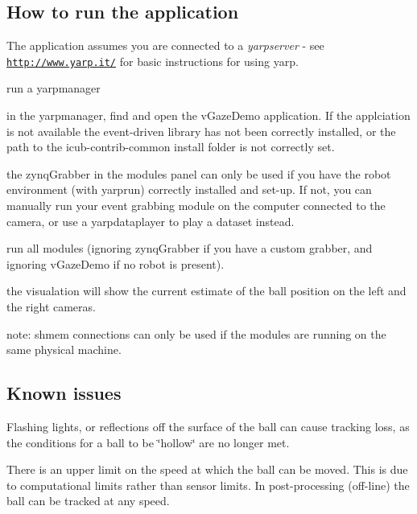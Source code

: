 \subsection*{How to run the application}

The application assumes you are connected to a {\itshape yarpserver} -\/ see \href{http://www.yarp.it/}{\tt http\+://www.\+yarp.\+it/} for basic instructions for using yarp.


\begin{DoxyEnumerate}
\item run a yarpmanager
\item in the yarpmanager, find and open the v\+Gaze\+Demo application. If the applciation is not available the event-\/driven library has not been correctly installed, or the path to the icub-\/contrib-\/common install folder is not correctly set.
\item the zynq\+Grabber in the modules panel can only be used if you have the robot environment (with yarprun) correctly installed and set-\/up. If not, you can manually run your event grabbing module on the computer connected to the camera, or use a yarpdataplayer to play a dataset instead.
\item run all modules (ignoring zynq\+Grabber if you have a custom grabber, and ignoring v\+Gaze\+Demo if no robot is present).
\item the visualation will show the current estimate of the ball position on the left and the right cameras.
\end{DoxyEnumerate}



note\+: shmem connections can only be used if the modules are running on the same physical machine.

\subsection*{Known issues}


\begin{DoxyItemize}
\item Flashing lights, or reflections off the surface of the ball can cause tracking loss, as the conditions for a ball to be \char`\"{}hollow\char`\"{} are no longer met.
\item There is an upper limit on the speed at which the ball can be moved. This is due to computational limits rather than sensor limits. In post-\/processing (off-\/line) the ball can be tracked at any speed. 
\end{DoxyItemize}